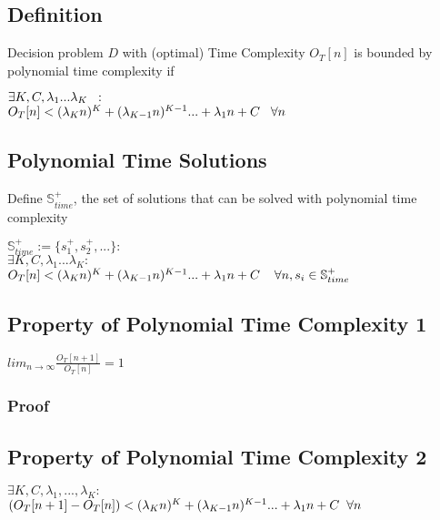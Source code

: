 \documentclass[11pt]{article}
\begin{document}
\subsection{Definition}
Decision problem $D$ with (optimal) Time Complexity $O_T[n]$ is bounded by polynomial time complexity if
\begin{center}
$\exists K,C,\lambda_1...\lambda_K \hspace{2mm} :$
\\ \vspace{2mm}
$O_T[n] < (\lambda_K n)^K + (\lambda_{K-1} n)^{K-1}... + \lambda_1 n + C \hspace{3mm} \forall n$
\end{center}








\subsection{Polynomial Time Solutions}
Define $\mathbb{S}^+_{time}$, the set of solutions that can be solved with polynomial time complexity
\begin{center}
$
\mathbb{S}^+_{time} := \{s^+_1,s^+_2,...\} : 
$
\\
$
\exists K,C,\lambda_1...\lambda_K : 
$
\\
$
O_T[n] < (\lambda_K n)^K + (\lambda_{K-1} n)^{K-1}... + \lambda_1 n + C \hspace{4mm} \forall n, s_i \in \mathbb{S}^+_{time}
$
\end{center}








\subsection{Property of Polynomial Time Complexity 1}
\begin{center}
$
lim_{n \rightarrow \infty} \frac{O_T[n+1]}{O_T[n]} = 1
$
\end{center}
\subsubsection{Proof}


\subsection{Property of Polynomial Time Complexity 2}
\begin{center}
$
\exists K,C,\lambda_1,...,\lambda_K :
$
\\ \vspace{2mm}
$
(O_T[n+1] - O_T[n]) <  (\lambda_K n)^K + (\lambda_{K-1} n)^{K-1}... + \lambda_1 n + C \hspace{2mm} \forall n
$
\end{center}
\end{document}
